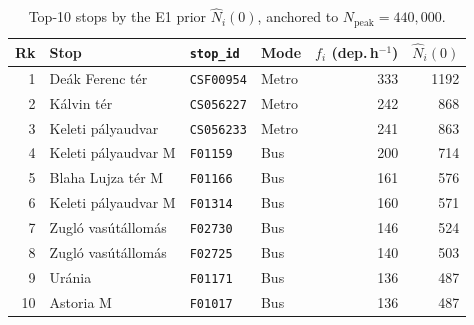 \begin{table}[htbp]
\centering
\small
\begin{tabular}{rlllrr}
\toprule
Rk & Stop & \texttt{stop\_id} & Mode & $f_i$ (dep.\,h$^{-1}$) & $\hat N_i(0)$ \\
\midrule
1 & De\'ak Ferenc t\'er & \texttt{CSF00954} & Metro & 333 & 1192 \\
2 & K\'alvin t\'er & \texttt{CS056227} & Metro & 242 & 868 \\
3 & Keleti p\'alyaudvar & \texttt{CS056233} & Metro & 241 & 863 \\
4 & Keleti p\'alyaudvar M & \texttt{F01159} & Bus & 200 & 714 \\
5 & Blaha Lujza t\'er M & \texttt{F01166} & Bus & 161 & 576 \\
6 & Keleti p\'alyaudvar M & \texttt{F01314} & Bus & 160 & 571 \\
7 & Zugl\'o vas\'ut\'allom\'as & \texttt{F02730} & Bus & 146 & 524 \\
8 & Zugl\'o vas\'ut\'allom\'as & \texttt{F02725} & Bus & 140 & 503 \\
9 & Ur\'ania & \texttt{F01171} & Bus & 136 & 487 \\
10 & Astoria M & \texttt{F01017} & Bus & 136 & 487 \\
\bottomrule
\end{tabular}
\caption{Top-10 stops by the E1 prior $\hat N_i(0)$, anchored to $N_{\mathrm{peak}}=440{,}000$.}
\label{tab:prior-top10}
\par{}
\end{table}
